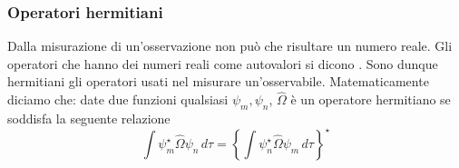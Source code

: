 \subsubsection{Operatori hermitiani}
Dalla misurazione di un'osservazione non può che risultare un numero reale. Gli operatori che hanno dei numeri reali come autovalori si dicono . Sono dunque hermitiani gli operatori usati nel misurare un'osservabile. Matematicamente diciamo che: date due funzioni qualsiasi $\psi_m, \psi_n$, $\hat{\Omega}$ è un operatore hermitiano se soddisfa la seguente relazione
$$\int \psi_m^{\star} \hat{\Omega} \psi_n\, d\tau = \left \{ \int \psi_n^{\star} \hat{\Omega} \psi_m\, d\tau \right \}^{\star}$$
